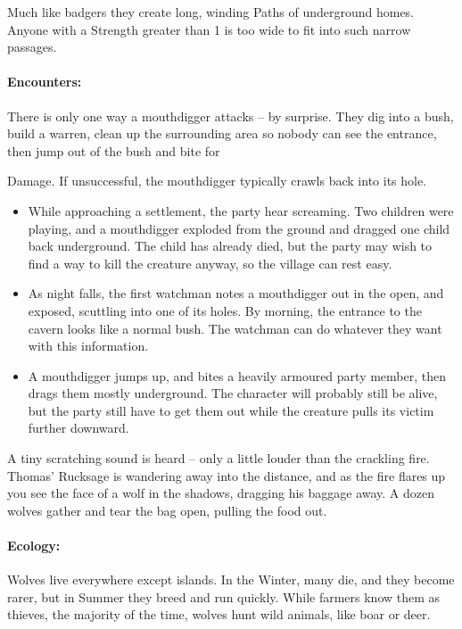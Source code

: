 \begin{multicols}{2}
Much like badgers they create long, winding Paths of underground homes.  Anyone with a Strength greater than 1 is too wide to fit into such narrow passages.

\paragraph{Encounters:} There is only one way a mouthdigger attacks -- by surprise.  They dig into a bush, build a warren, clean up the surrounding area so nobody can see the entrance, then jump out of the bush and bite for \addtocounter{strb}{-5} Damage.  If unsuccessful, the mouthdigger typically crawls back into its hole.

\begin{itemize}

	\item{While approaching a settlement, the party hear screaming.
	Two children were playing, and a mouthdigger exploded from the ground and dragged one child back underground.
	The child has already died, but the party may wish to find a way to kill the creature anyway, so the village can rest easy.}
	\item{As night falls, the first watchman notes a mouthdigger out in the open, and exposed, scuttling into one of its holes.
	By morning, the entrance to the cavern looks like a normal bush.
	The watchman can do whatever they want with this information.}
	\item{A mouthdigger jumps up, and bites a heavily armoured party member, then drags them mostly underground.
	The character will probably still be alive, but the party still have to get them out while the creature pulls its victim further downward.}

\end{itemize}

\mouthdigger

\label{wolf}

\begin{boxtext}

	A tiny scratching sound is heard -- only a little louder than the crackling fire.
	Thomas' Rucksage is wandering away into the distance, and as the fire flares up you see the face of a wolf in the shadows, dragging his baggage away.
	A dozen wolves gather and tear the bag open, pulling the food out.

\end{boxtext}

\paragraph{Ecology:} Wolves live everywhere except islands.  In the Winter, many die, and they become rarer, but in Summer they breed and run quickly.  While farmers know them as thieves, the majority of the time, wolves hunt wild animals, like boar or deer.


\end{multicols}
